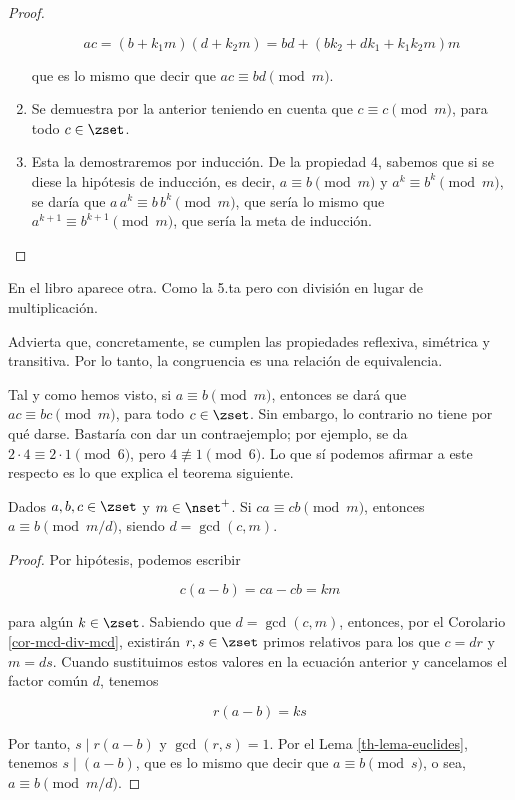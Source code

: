 \begin{proof}
\begin{enumerate}
      $$ ac = (b + k_1 m)(d + k_2 m) = bd + (bk_2 + dk_1 + k_1 k_2 m)m $$

      \noindent que es lo mismo que decir que $ac \equiv bd \pmod m$.

    \item Se demuestra por la anterior teniendo en cuenta que $c \equiv c
      \pmod m$, para todo $c \in \zset$.

    \item Esta la demostraremos por inducción. De la propiedad 4, sabemos
      que si se diese la hipótesis de inducción, es decir, $a \equiv b \pmod
      m$ y $a^k \equiv b^k \pmod m$, se daría que $a \, a^k \equiv b \, b^k
      \pmod m$, que sería lo mismo que $a^{k+1} \equiv b^{k+1} \pmod m$, que
      sería la meta de inducción.


  \end{enumerate}
\end{proof}

En el libro aparece otra. Como la 5.ta pero con división en lugar de
multiplicación.

Advierta que, concretamente, se cumplen las propiedades reflexiva, simétrica
y transitiva. Por lo tanto, la congruencia es una relación de equivalencia.

Tal y como hemos visto, si $a \equiv b \pmod m$, entonces se dará que $ac
\equiv bc \pmod m$, para todo $c \in \zset$. Sin embargo, lo contrario no
tiene por qué darse. Bastaría con dar un contraejemplo; por ejemplo, se da
$2 \cdot 4 \equiv 2 \cdot 1 \pmod 6$, pero $4 \not\equiv 1 \pmod 6$. Lo que
sí podemos afirmar a este respecto es lo que explica el teorema siguiente.

\begin{theorem}
  Dados $a, b, c \in \zset$ y $m \in \nset^{+}$. Si $ca \equiv cb \pmod m$,
  entonces $a \equiv b \pmod {m/d}$, siendo $d = \gcd(c, m)$.
\end{theorem}

\begin{proof}
  Por hipótesis, podemos escribir

  $$ c(a - b) = ca - cb = km $$

  \noindent para algún $k \in \zset$. Sabiendo que $d = \gcd(c, m)$,
  entonces, por el Corolario \ref{cor-mcd-div-mcd}, existirán $r, s \in
  \zset$ primos relativos para los que $c = dr$ y $m = ds$. Cuando
  sustituimos estos valores en la ecuación anterior y cancelamos el factor
  común $d$, tenemos

  $$ r(a - b) = ks $$

  \noindent Por tanto, $s \mid r(a - b)$ y $\gcd(r, s) = 1$. Por el Lema
  \ref{th-lema-euclides}, tenemos $s \mid (a - b)$, que es lo mismo que
  decir que $a \equiv b \pmod s$, o sea, $a \equiv b \pmod {m/d}$.
\end{proof}

